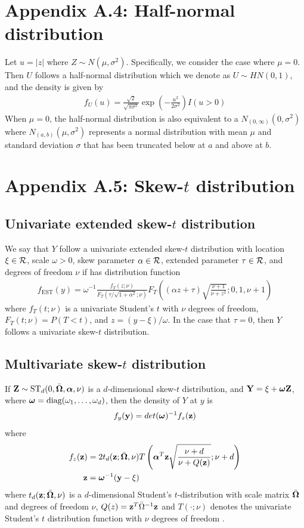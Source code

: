 \documentclass[11pt]{article}
\begin{document}
\section*{Appendix A.4: Half-normal distribution}
Let $u = |z|$ where $Z \sim N(\mu, \sigma^2)$.
Specifically, we consider the case where $\mu = 0$. Then $U$ follows a half-normal distribution which we denote as $U \sim HN(0, 1)$, and the density is given by
\begin{align}
  f_U(u) = \frac{ \sqrt{2} }{ \sqrt{\pi \sigma^2} } \exp \left( - \frac{ u^2 }{ 2 \sigma^2 } \right) I(u > 0)
\end{align}
When $\mu = 0$, the half-normal distribution is also equivalent to a $N_{(0, \infty)}(0, \sigma^2)$ where $N_{(a, b)}(\mu, \sigma^2)$ represents a normal distribution with mean $\mu$ and standard deviation $\sigma$ that has been truncated below at $a$ and above at $b$.

\section*{Appendix A.5: Skew-$t$ distribution}
\subsection*{Univariate extended skew-$t$ distribution}
We say that $Y$ follow a univariate extended skew-$t$ distribution with location $\xi \in {\cal R}$, scale $\omega > 0$, skew parameter $\alpha \in {\cal R}$, extended parameter $\tau \in {\cal R}$, and degrees of freedom $\nu$ if has distribution function
\begin{align}
  f_{\text{EST}}(y) = \omega^{-1} \frac{ f_T (z; \nu) }{ F_T(\tau / \sqrt{ 1 + \alpha^2}; \nu)} F_T\left( (\alpha z + \tau) \sqrt{ \frac{ \nu + 1 }{ \nu + z^2}}; 0, 1, \nu + 1 \right)
\end{align}
where $f_T(t; \nu)$ is a univariate Student's $t$ with $\nu$ degrees of freedom, $F_T(t; \nu) = P(T < t)$, and $z = (y - \xi) / \omega$.
In the case that $\tau = 0$, then $Y$ follows a univariate skew-$t$ distribution.
\subsection*{Multivariate skew-$t$ distribution}
If $\mbox{\bf Z} \sim \text{ST}_d(0, \bar{\mbox{\boldmath $\Omega$}}, \mbox{\boldmath $\alpha$}, \nu)$ is a $d$-dimensional skew-$t$ distribution, and $\mbox{\bf Y} = \xi + \mbox{\boldmath $\omega$} \mbox{\bf Z}$, where $\mbox{\boldmath $\omega$} = \text{diag}(\omega_1, \ldots, \omega_d)$, then the density of $Y$ at $y$ is
\begin{align*}
  f_y(\mbox{\bf y}) = det(\mbox{\boldmath $\omega$})^{-1} f_z(\mbox{\bf z})
\end{align*}
where
\begin{align*}
  f_z(\mbox{\bf z}) &= 2 t_d(\mbox{\bf z}; \bar{\mbox{\boldmath $\Omega$}}, \nu) T \left( \mbox{\boldmath $\alpha$}^T \mbox{\bf z} \sqrt{ \frac{\nu + d}{\nu + Q(\mbox{\bf z})} }; \nu + d\right) \\
  \mbox{\bf z} &= \mbox{\boldmath $\omega$}^{-1}(\mbox{\bf y} - \xi)
\end{align*}
where $t_d(\mbox{\bf z}; \bar{\mbox{\boldmath $\Omega$}}, \nu)$ is a $d$-dimensional Student's $t$-distribution with scale matrix $\bar{\mbox{\boldmath $\Omega$}}$ and degrees of freedom $\nu$, $Q(z) = \mbox{\bf z}^T \bar{\Omega}^{-1}\mbox{\bf z}$ and $T(\cdot; \nu)$ denotes the univariate Student's $t$ distribution function with $\nu$ degrees of freedom \citep{Azzalini2013}.
\end{document}
